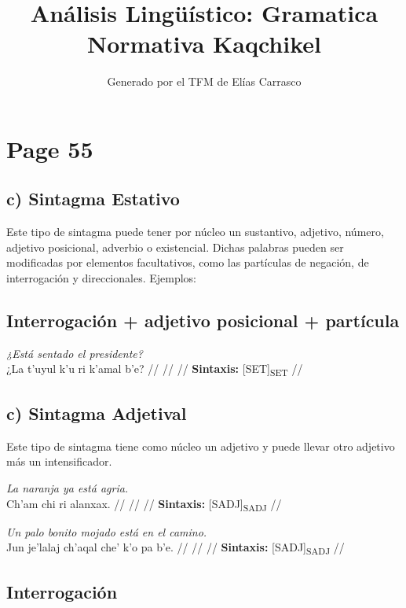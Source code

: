 \documentclass{article}%
\title{Análisis Lingüístico: Gramatica Normativa Kaqchikel}%
\author{Generado por el TFM de Elías Carrasco}%
\begin{document}
%
\normalsize%
\maketitle%
\section{Page 55}%
\label{sec:Page55}%
\subsection{c) Sintagma Estativo}%
\label{subsec:c)SintagmaEstativo}%

%
Este tipo de sintagma puede tener por núcleo un sustantivo, adjetivo, número, adjetivo %
posicional, adverbio o existencial. Dichas palabras pueden ser modificadas por %
elementos facultativos, como las partículas de negación, de interrogación y direccionales. %
Ejemplos: %
\subsection{Interrogación + adjetivo posicional + partícula}%
\label{subsec:Interrogacin+adjetivoposicional+partcula}%

%
\par\medskip%
\ex
\textit{¿Está sentado el presidente?} \\
\begingl
\gla ¿La t’uyul k’u ri k’amal b'e? //
\glb  //
\glc  //
\glft \textbf{Sintaxis:} [SET]\textsubscript{SET} //
\endgl
\xe
%
\medskip%
\subsection{c) Sintagma Adjetival}%
\label{subsec:c)SintagmaAdjetival}%

%
Este tipo de sintagma tiene como núcleo un adjetivo y puede llevar otro adjetivo más un %
intensificador. %
\par\medskip%
\ex
\textit{La naranja ya está agria.} \\
\begingl
\gla Ch'am chi ri alanxax. //
\glb  //
\glc  //
\glft \textbf{Sintaxis:} [SADJ]\textsubscript{SADJ} //
\endgl
\xe
%
\medskip%
\par\medskip%
\ex
\textit{Un palo bonito mojado está en el camino.} \\
\begingl
\gla Jun je’lalaj ch’aqal che' k'o pa b’e. //
\glb  //
\glc  //
\glft \textbf{Sintaxis:} [SADJ]\textsubscript{SADJ} //
\endgl
\xe
%
\medskip%
\subsection{Interrogación}%
\label{subsec:Interrogacin}%
\end{document}
